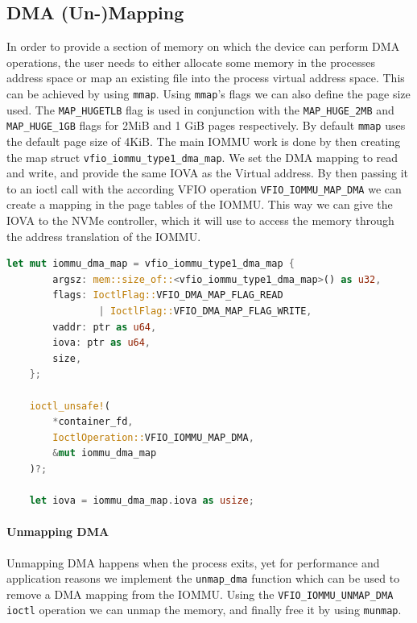 \subsection{DMA (Un-)Mapping}\label{sec:dmamapping}
In order to provide a section of memory on which the device can perform DMA operations, the user needs to either allocate some memory in the processes address space or map an existing file into the process virtual address space. This can be achieved by using \texttt{mmap}. Using \texttt{mmap}'s flags we can also define the page size used. The \texttt{MAP\_HUGETLB} flag is used in conjunction with the \texttt{MAP\_HUGE\_2MB} and \texttt{MAP\_HUGE\_1GB} flags for 2MiB and 1 GiB pages respectively. By default \texttt{mmap} uses the default page size of 4KiB.
The main IOMMU work is done by then creating the map struct \texttt{vfio\_iommu\_type1\_dma\_map}. We set the DMA mapping to read and write, and provide the same IOVA as the Virtual address. By then passing it to an ioctl call with the according VFIO operation \texttt{VFIO\_IOMMU\_MAP\_DMA} we can create a mapping in the page tables of the IOMMU. This way we can give the IOVA to the NVMe controller, which it will use to access the memory through the address translation of the IOMMU.

\begin{lstlisting}[language=Rust,caption={Mapping memory for DMA}, label=lst:mapdma]
    let mut iommu_dma_map = vfio_iommu_type1_dma_map {
        argsz: mem::size_of::<vfio_iommu_type1_dma_map>() as u32,
        flags: IoctlFlag::VFIO_DMA_MAP_FLAG_READ 
                | IoctlFlag::VFIO_DMA_MAP_FLAG_WRITE,
        vaddr: ptr as u64,
        iova: ptr as u64,
        size,
    };

    ioctl_unsafe!(
        *container_fd,
        IoctlOperation::VFIO_IOMMU_MAP_DMA,
        &mut iommu_dma_map
    )?;

    let iova = iommu_dma_map.iova as usize; 
\end{lstlisting}

\paragraph{Unmapping DMA}
Unmapping DMA happens when the process exits, yet for performance and application reasons we implement the \texttt{unmap\_dma} function which can be used to remove a DMA mapping from the IOMMU. Using the \texttt{VFIO\_IOMMU\_UNMAP\_DMA} \texttt{ioctl} operation we can unmap the memory, and finally free it by using \texttt{munmap}.

